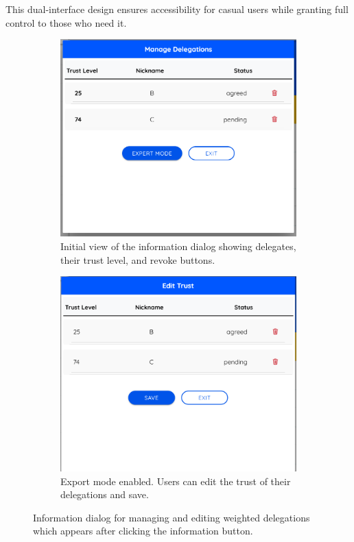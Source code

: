 This dual-interface design ensures accessibility for casual users while granting full control to those who need it.

\begin{figure}[H]
  \centering
  \begin{subfigure}[t]{0.45\textwidth}
  \centering
  \includegraphics[width=\linewidth]{../common/weighted_sc/info.png}
  \caption{Initial view of the information dialog showing delegates, their trust level, and revoke buttons.}
  \end{subfigure}
  \hfill
  \begin{subfigure}[t]{0.45\textwidth}
  \centering
  \includegraphics[width=\linewidth]{../common/weighted_sc/expert.png}
  \caption{Export mode enabled. Users can edit the trust of their delegations and save.}
  \end{subfigure}
  
  \caption{Information dialog for managing and editing weighted delegations which appears after clicking the information button.}
  \label{fig:weighted_info}
\end{figure}

